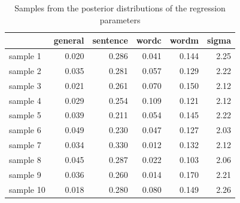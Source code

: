 \documentclass[11pt,a4paper,twoside]{book}\usepackage[]{graphicx}\usepackage[]{color}
\newenvironment{knitrout}{}{} %
\begin{document}
\begin{knitrout}
\color{fgcolor}\begin{table}

\caption{\label{tab:empirical.data.postsample2}Samples from the posterior distributions of the regression parameters}
\centering
\begin{tabular}[t]{lrrrrr}
\toprule
  & general & sentence & wordc & wordm & sigma\\
\midrule
sample 1 & 0.020 & 0.286 & 0.041 & 0.144 & 2.25\\
sample 2 & 0.035 & 0.281 & 0.057 & 0.129 & 2.22\\
sample 3 & 0.021 & 0.261 & 0.070 & 0.150 & 2.12\\
sample 4 & 0.029 & 0.254 & 0.109 & 0.121 & 2.12\\
sample 5 & 0.039 & 0.211 & 0.054 & 0.145 & 2.22\\
sample 6 & 0.049 & 0.230 & 0.047 & 0.127 & 2.03\\
sample 7 & 0.034 & 0.330 & 0.012 & 0.132 & 2.12\\
sample 8 & 0.045 & 0.287 & 0.022 & 0.103 & 2.06\\
sample 9 & 0.036 & 0.260 & 0.014 & 0.170 & 2.21\\
sample 10 & 0.018 & 0.280 & 0.080 & 0.149 & 2.26\\
\bottomrule
\end{tabular}
\end{table}


\end{knitrout}
\end{document}
